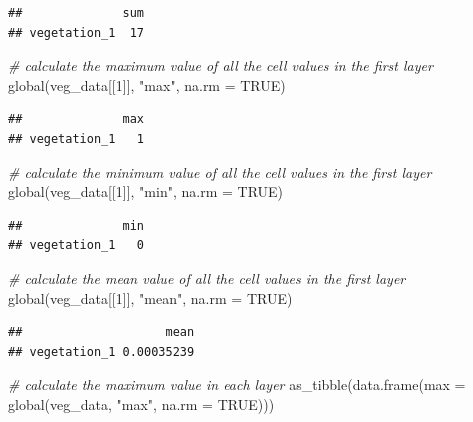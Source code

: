 \documentclass[
  12pt,
]{book}
\newenvironment{Shaded}{\begin{snugshade}}{\end{snugshade}}
\newcommand{\AttributeTok}[1]{\textcolor[rgb]{0.77,0.63,0.00}{#1}}
\newcommand{\CommentTok}[1]{\textcolor[rgb]{0.56,0.35,0.01}{\textit{#1}}}
\newcommand{\ConstantTok}[1]{\textcolor[rgb]{0.00,0.00,0.00}{#1}}
\newcommand{\DecValTok}[1]{\textcolor[rgb]{0.00,0.00,0.81}{#1}}
\newcommand{\FunctionTok}[1]{\textcolor[rgb]{0.00,0.00,0.00}{#1}}
\newcommand{\NormalTok}[1]{#1}
\newcommand{\StringTok}[1]{\textcolor[rgb]{0.31,0.60,0.02}{#1}}
\begin{document}
\begin{verbatim}
##              sum
## vegetation_1  17
\end{verbatim}

\begin{Shaded}
\begin{Highlighting}[]
\CommentTok{\# calculate the maximum value of all the cell values in the first layer}
\FunctionTok{global}\NormalTok{(veg\_data[[}\DecValTok{1}\NormalTok{]], }\StringTok{"max"}\NormalTok{, }\AttributeTok{na.rm =} \ConstantTok{TRUE}\NormalTok{)}
\end{Highlighting}
\end{Shaded}

\begin{verbatim}
##              max
## vegetation_1   1
\end{verbatim}

\begin{Shaded}
\begin{Highlighting}[]
\CommentTok{\# calculate the minimum value of all the cell values in the first layer}
\FunctionTok{global}\NormalTok{(veg\_data[[}\DecValTok{1}\NormalTok{]], }\StringTok{"min"}\NormalTok{, }\AttributeTok{na.rm =} \ConstantTok{TRUE}\NormalTok{)}
\end{Highlighting}
\end{Shaded}

\begin{verbatim}
##              min
## vegetation_1   0
\end{verbatim}

\begin{Shaded}
\begin{Highlighting}[]
\CommentTok{\# calculate the mean value of all the cell values in the first layer}
\FunctionTok{global}\NormalTok{(veg\_data[[}\DecValTok{1}\NormalTok{]], }\StringTok{"mean"}\NormalTok{, }\AttributeTok{na.rm =} \ConstantTok{TRUE}\NormalTok{)}
\end{Highlighting}
\end{Shaded}

\begin{verbatim}
##                    mean
## vegetation_1 0.00035239
\end{verbatim}

\clearpage

\begin{Shaded}
\begin{Highlighting}[]
\CommentTok{\# calculate the maximum value in each layer}
\FunctionTok{as\_tibble}\NormalTok{(}\FunctionTok{data.frame}\NormalTok{(}\AttributeTok{max =} \FunctionTok{global}\NormalTok{(veg\_data, }\StringTok{"max"}\NormalTok{, }\AttributeTok{na.rm =} \ConstantTok{TRUE}\NormalTok{)))}
\end{Highlighting}
\end{Shaded}
\end{document}
